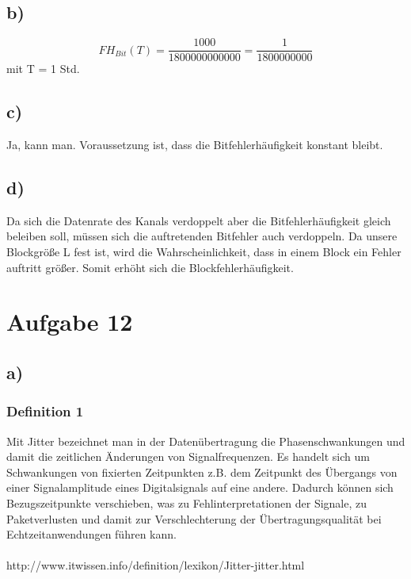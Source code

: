\documentclass[a4paper,12pt]{scrartcl}
\begin{document}
\subsection{b)}
\[FH_{Bit}(T) = \frac{1000}{1800000000000} = \frac{1}{1800000000}\]
mit T = 1 Std.

\subsection{c)}
Ja, kann man. Voraussetzung ist, dass die Bitfehlerhäufigkeit konstant bleibt.

\subsection{d)}
Da sich die Datenrate des Kanals verdoppelt aber die Bitfehlerhäufigkeit gleich beleiben soll, müssen sich die auftretenden Bitfehler auch verdoppeln. Da unsere Blockgröße L fest ist, wird die Wahrscheinlichkeit, dass in einem Block ein Fehler auftritt größer. Somit erhöht sich die Blockfehlerhäufigkeit.

\section{Aufgabe 12}
\subsection{a)}
\subsubsection{Definition 1}
Mit Jitter bezeichnet man in der Datenübertragung die Phasenschwankungen und damit die zeitlichen Änderungen von Signalfrequenzen. Es handelt sich um Schwankungen von fixierten Zeitpunkten z.B. dem Zeitpunkt des Übergangs von einer Signalamplitude eines Digitalsignals auf eine andere. Dadurch können sich Bezugszeitpunkte verschieben, was zu Fehlinterpretationen der Signale, zu Paketverlusten und damit zur Verschlechterung der Übertragungsqualität bei Echtzeitanwendungen führen kann. \\
\\
http://www.itwissen.info/definition/lexikon/Jitter-jitter.html
\end{document}
